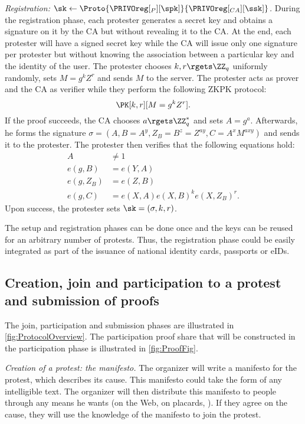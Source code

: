\emph{Registration: \(\sk\gets 
    \Proto{\PRIVOreg[_P][\spk]}{\PRIVOreg[_{CA}][\ssk]}\).}
During the registration phase, each protester generates a secret key and obtains a signature on it by the \ac{CA} but without revealing it to the \ac{CA}.
At the end, each protester will have a signed secret key while the \ac{CA} will issue only one signature per protester but without knowing the association between a particular key and the identity of the user.
The protester chooses \(k, r\rgets \ZZ_q\) uniformly randomly, sets \(M = g^k Z^r\) and sends \(M\) to the server.
The protester acts as prover and the \ac{CA} as verifier while they perform the following \ac{ZKPK} protocol:
\[
  \PK[k,r][M = g^k Z^r].
\]
If the proof succeeds, the \ac{CA} chooses \(a\rgets \ZZ_q^*\) and sets \(A = g^a\).
Afterwards, he forms the signature \(\sigma = (A, B = A^y, Z_B = B^z = Z^{ay}, C = A^x M^{axy})\) and sends it to the protester.
The protester then verifies that the following equations hold:
\begin{align*}
  A &\neq 1 \\
  e(g, B) &= e(Y, A) \\
  e(g, Z_B) &= e(Z, B) \\
  e(g, C) &= e(X, A) e(X, B)^k e(X, Z_B)^r.
\end{align*}
Upon success, the protester sets \(\sk = (\sigma, k, r)\).

The setup and registration phases can be done once and the keys can be reused for an arbitrary number of protests.
Thus, the registration phase could be easily integrated as part of the issuance of national identity cards, passports or \acp{eID}.

\subsection{Creation, join and participation to a protest and submission of proofs}%
\label{ProtocolDuring}

The join, participation and submission phases are illustrated in \cref{fig:ProtocolOverview}.
The participation proof share that will be constructed in the participation phase is illustrated in \cref{fig:ProofFig}.

\emph{Creation of a protest: the manifesto.}
The organizer will write a manifesto for the protest, which describes its cause.
This manifesto could take the form of any intelligible text.
The organizer will then distribute this manifesto to people through any means he wants (\eg on the Web, on placards, \etc).
If they agree on the cause, they will use the knowledge of the manifesto to join the protest.


